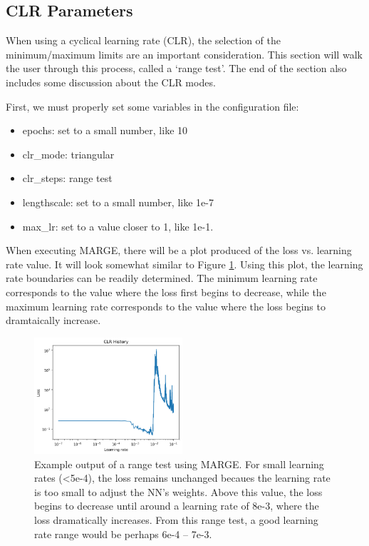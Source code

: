 \documentclass[letterpaper, 12pt]{article}
\begin{document}
\subsection{CLR Parameters}

When using a cyclical learning rate (CLR), the selection of the minimum/maximum 
limits are an important consideration.  This section will walk the user through 
this process, called a `range test'.  The end of the section also includes some 
discussion about the CLR modes.  \newline

\noindent First, we must properly set some variables in the configuration file:
\begin{itemize}
\item epochs: set to a small number, like 10
\item clr\_mode: triangular
\item clr\_steps: range test
\item lengthscale: set to a small number, like 1e-7
\item max\_lr: set to a value closer to 1, like 1e-1.
\end{itemize}

\noindent When executing MARGE, there will be a plot produced of the loss vs. 
learning rate value.  It will look somewhat similar to Figure 
\ref{fig:rangetest}.  Using this plot, the learning rate boundaries can be 
readily determined.  The minimum learning rate corresponds to the value where 
the loss first begins to decrease, while the maximum learning rate corresponds 
to the value where the loss begins to dramtaically increase.\newline

\begin{figure}[h]
\centering
\includegraphics[width=0.49\textwidth, clip]{range_test.png}
\caption{Example output of a range test using MARGE.  For small learning rates 
(\textless 5e-4), the loss remains unchanged becaues the learning rate is too 
small to adjust the NN's weights.  Above this value, the loss begins to decrease
until around a learning rate of 8e-3, where the loss dramatically increases. 
From this range test, a good learning rate range would be perhaps 6e-4 -- 
7e-3.}  
\label{fig:rangetest}
\end{figure}
\end{document}
